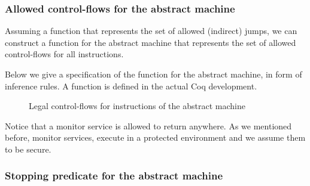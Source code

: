 \subsubsection{Allowed control-flows for the abstract machine}
\label{sec:abstract_flow}

Assuming a function \CFG that represents the set of allowed (indirect) jumps,
we can construct a function \SUCC for the abstract machine that represents
the set of allowed control-flows for all instructions.

Below we give a specification of the \SUCC function for the abstract machine,
in form of inference rules. A function is defined in the actual Coq development.

\begin{figure}[!htpb]
\bigskip

\bigskip

\bigskip

\caption{Legal control-flows for instructions of the abstract machine}
\end{figure}

Notice that a monitor service is allowed to return anywhere. As we mentioned
before, monitor services, execute in a protected environment and we assume them
to be secure.

\subsubsection{Stopping predicate for the abstract machine}
\label{sec:abstract_stopping}

